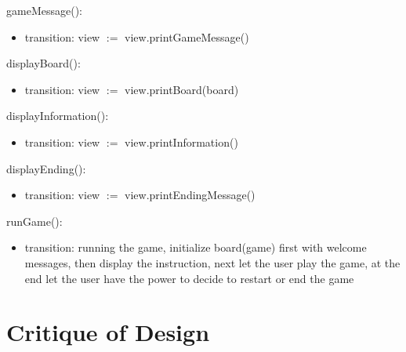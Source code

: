 \documentclass[12pt]{article}
\begin{document}
\noindent gameMessage():
\begin{itemize}
  \item transition: view $:=$ view.printGameMessage()
\end{itemize}

\noindent displayBoard():
\begin{itemize}
  \item transition: view $:=$ view.printBoard(board)
\end{itemize}

\noindent displayInformation():
\begin{itemize}
  \item transition: view $:=$ view.printInformation()
\end{itemize}

\noindent displayEnding():
\begin{itemize}
  \item transition: view $:=$ view.printEndingMessage()
\end{itemize}

\noindent runGame():
\begin{itemize}
  \item transition: running the game, initialize board(game) first with welcome messages, then display the instruction, next let the user
                    play the game, at the end let the user have the power to decide to restart or end the game
\end{itemize}





\newpage

\section*{Critique of Design}
\end{document}

